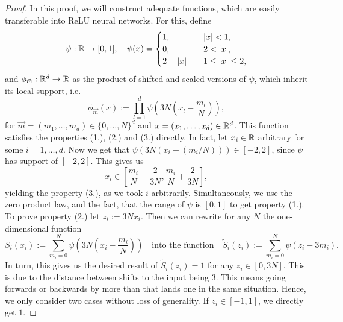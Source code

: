 \begin{proof}
    In this proof, we will construct adequate functions, which are
    easily transferable into ReLU neural networks. For this, define
    \begin{equation*}
        \psi: \mathbb{R} \to [0, 1], \quad \psi(x) = \begin{cases}
            1, \quad &\vert x \vert < 1, \\
            0, \quad &2 < \vert x \vert, \\
            2 - \vert x \vert \quad &1 \leq \vert x \vert \leq 2,
        \end{cases}
    \end{equation*}
    and $\phi_{\vec{m}}: \mathbb{R}^d \to \mathbb{R}$ as the product of shifted and scaled versions of $\psi$, which inherit its local
    support, i.e.
    \begin{equation*}
        \phi_{\vec{m}}(x) := \prod_{l=1}^d \psi \left( 3N \left( x_l - \frac{m_l}{N} \right) \right),
    \end{equation*}
    for $\vec{m} = (m_1, \dots, m_d) \in \{0, \dots, N\}^d$ and $x = (x_1, \dots, x_d) \in \mathbb{R}^d$. 
    This function satisfies the properties (1.), (2.) and (3.) directly. In fact, let $x_i \in \mathbb{R}$ arbitrary 
    for some $i = 1, \dots, d$.
    Now we get that $\psi(3N(x_i - (m_i/N))) \in [-2, 2]$, since $\psi$ has support of $[-2, 2]$. This gives us
    \begin{equation*}
        x_i \in \left[\frac{m_i}{N} - \frac{2}{3N}, \frac{m_i}{N} + \frac{2}{3N}\right],
    \end{equation*}
    yielding the property (3.), as we took $i$ arbitrarily. Simultaneously, we use the zero product law,
    and the fact, that the range of $\psi$ is $[0, 1]$ to get property (1.). To prove property (2.) let $z_i := 3Nx_i$. Then we
    can rewrite for any $N$ the one-dimensional function 
    \begin{equation*}
        S_i(x_i) := \sum_{m_i = 0}^N \psi\left( 3N \left( x_i - \frac{m_i}{N} \right) \right)\quad \text{into the function} \quad
        \tilde{S}_i(z_i) := \sum_{m_i=0}^N \psi(z_i - 3m_i).
    \end{equation*}
    In turn, this gives us the desired result of $\tilde{S}_i(z_i) = 1$ for any $z_i \in [0, 3N]$. This is due to the
    distance between shifts to the input being $3$. This means 
    going forwards or backwards by more than that lands one in the same situation. 
    Hence, we only consider two cases without loss of generality. If $z_i \in [-1, 1]$, we directly get $1$.

\end{proof}
